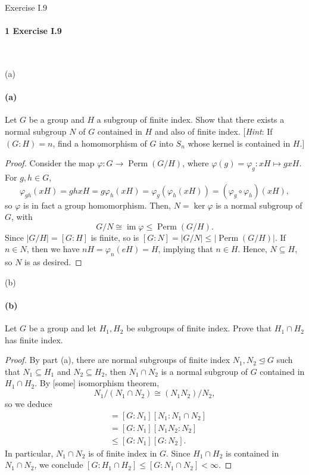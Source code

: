 \documentclass[12pt]{article}
\newlength{\myparskip}
\newenvironment{fullbox}{\begin{lrbox}{\savefullbox}\begin{minipage}{\dimexpr\textwidth-2\fboxsep\relax}\setlength{\parskip}{\myparskip}}{\end{minipage}\end{lrbox}\framebox[\textwidth]{\usebox{\savefullbox}}}
\newenvironment{pbox}[1][]{\begin{fullbox}\ifx#1\empty\else\paragraph{#1}\fi}{\end{fullbox}}
\renewcommand{\phi}{\varphi}
\newcommand{\<}{\langle}
\renewcommand{\>}{\rangle}
\newcommand{\isom}{\cong}
\DeclareMathOperator{\Perm}{Perm}
\DeclareMathOperator{\im}{im}
\newcommand{\teq}{\trianglelefteq}
\theoremstyle{definition}
\begin{document}
\thispagestyle{title}

\begin{pbox}[1 Exercise I.9]
    \,
\end{pbox}

\begin{pbox}[(a)]
    Let $G$ be a group and $H$ a subgroup of finite index. Show that there exists a normal subgroup $N$ of $G$ contained in $H$ and also of finite index. [\textit{Hint}: If $(G : H) = n$, find a homomorphism of $G$ into $S_n$ whose kernel is contained in $H$.]
\end{pbox}

\begin{proof}
    Consider the map $\phi: G \to \Perm(G/H)$, where $\phi(g) = \phi_g : xH \mapsto gxH$. For $g, h \in G$,
    \[
        \phi_{gh}(xH) = ghxH = g\phi_h(xH) = \phi_g(\phi_h(xH)) = (\phi_g \circ \phi_h)(xH),
    \]
    so $\phi$ is in fact a group homomorphism. Then, $N = \ker\phi$ is a normal subgroup of $G$, with
    \[
        G/N \isom \im\phi \leq \Perm(G/H).
    \]
    Since $|G/H| = [G : H]$ is finite, so is $[G : N] = |G/N| \leq |\Perm(G/H)|$. If $n \in N$, then we have $nH = \phi_n(eH) = H$, implying that $n \in H$. Hence, $N \subseteq H$, so $N$ is as desired.

\end{proof}

\begin{pbox}[(b)]
    Let $G$ be a group and let $H_1, H_2$ be subgroups of finite index. Prove that $H_1 \cap H_2$ has finite index.
\end{pbox}

\begin{proof}
    By part (a), there are normal subgroups of finite index $N_1, N_2 \teq G$ such that $N_1 \subseteq H_1$ and $N_2 \subseteq H_2$, then $N_1 \cap N_2$ is a normal subgroup of $G$ contained in $H_1 \cap H_2$. By [some] isomorphism theorem,
    \[
        N_1/(N_1 \cap N_2) \isom (N_1N_2)/N_2,
    \]
    so we deduce
    \begin{align*}
        [G : N_1 \cap N_2]
            &= [G : N_1][N_1 : N_1 \cap N_2] \\
            &= [G : N_1][N_1N_2 : N_2] \\
            &\leq [G : N_1][G : N_2].
    \end{align*}
    In particular, $N_1 \cap N_2$ is of finite index in $G$. Since $H_1 \cap H_2$ is contained in $N_1 \cap N_2$, we conclude $[G : H_1 \cap H_2] \leq [G : N_1 \cap N_2] < \infty$.

\end{proof}
\end{document}
